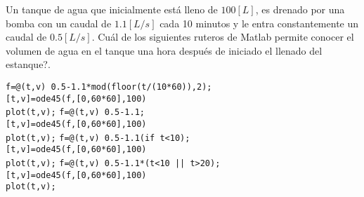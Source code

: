 \begin{pregunta}
\begin{cuerpo}
Un tanque de agua que inicialmente est\'a lleno de $100[L]$, es drenado por una bomba con un caudal de $1.1[L/s]$ cada 10 minutos y le entra constantemente un caudal de $0.5[L/s]$. \textquestiondown Cu\'al de los siguientes ruteros de Matlab permite conocer el volumen de agua en el tanque una hora despu\'es de iniciado el llenado del estanque?. 
\end{cuerpo}

\begin{alternativas}
{
\texttt{f=@(t,v) 0.5-1.1*mod(floor(t/(10*60)),2);}\\
\texttt{[t,v]=ode45(f,[0,60*60],100)}\\
\texttt{plot(t,v);}							
}
{
\texttt{f=@(t,v) 0.5-1.1;}\\
\texttt{[t,v]=ode45(f,[0,60*60],100)}\\
\texttt{plot(t,v);}							
}
{
\texttt{f=@(t,v) 0.5-1.1(if t<10);}\\
\texttt{[t,v]=ode45(f,[0,60*60],100)}\\
\texttt{plot(t,v);}							
}
{
\texttt{f=@(t,v) 0.5-1.1*(t<10 || t>20);}\\
\texttt{[t,v]=ode45(f,[0,60*60],100)}\\
\texttt{plot(t,v);}								
}
\end{alternativas}

\justificacion{0cm}
\end{pregunta}